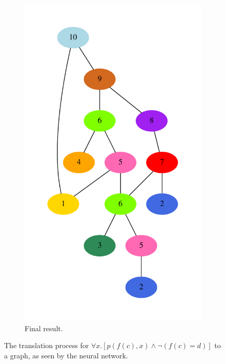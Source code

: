 \documentclass[runningheads]{llncs}
\begin{document}
\begin{figure}
\begin{subfigure}{.25\textwidth}
		\includegraphics[width=\linewidth]{translation-undirected}
		\caption{Final result.}
	\end{subfigure}
	\caption{The translation process for \(\forall x. \left[p\left(f(c), x\right) \wedge \lnot\left(f(c) = d\right)\right]\) to a graph, as seen by the neural network.}
	\label{figure:translation}
\end{figure}
\end{document}
